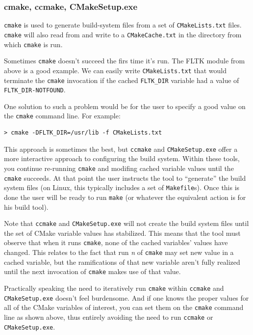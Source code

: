 \documentclass[letterpaper,10pt]{article}
\begin{document}
\subsubsection{cmake, ccmake, CMakeSetup.exe}
\label{sec:ccmake}
\verb|cmake| is used to generate build-system files from a set of \verb|CMakeLists.txt|
files.  \verb|cmake| will also read from and write to a \verb|CMakeCache.txt| in the
directory from which \verb|cmake| is run.

Sometimes \verb|cmake| doesn't succeed the firs time it's run.  The FLTK module from
above is a good example.  We can easily write \verb|CMakeLists.txt| that would terminate
the \verb|cmake| invocation if the cached \verb|FLTK_DIR| variable had a value of \verb|FLTK_DIR-NOTFOUND|.

One solution to such a problem would be for the user to specify a good value on the
\verb|cmake| command line.  For example:
\begin{verbatim}
> cmake -DFLTK_DIR=/usr/lib -f CMakeLists.txt
\end{verbatim} 

This approach is sometimes the best, but \verb|ccmake| and \verb|CMakeSetup.exe| offer a
more interactive approach to configuring the build system.  Within these tools, you continue
re-running \verb|cmake| and modifing cached variable values until the \verb|cmake| succeeds.
At that point the user instructs the tool to ``generate'' the build system files (on Linux,
this typically includes a set of \verb|Makefile|s).  Once this is done the user will 
be ready to run \verb|make| (or whatever the equivalent action is for his build tool).

Note that \verb|ccmake| and \verb|CMakeSetup.exe| will not create the build system files
until the set of CMake variable values has stabilized.  This means that the tool must observe
that when it runs \verb|cmake|, none of the cached variables' values have changed.  This
relates to the fact that run \textit{n} of \verb|cmake| may set new value in a cached variable,
but the ramifications of that new variable aren't fully realized until the next invocation of
\verb|cmake| makes use of that value.

Practically speaking the need to iteratively run \verb|cmake| within \verb|ccmake| and \verb|CMakeSetup.exe| doesn't feel burdensome.  And if one knows the proper values for all
of the CMake variables of interest, you can set them on the \verb|cmake| command line 
as shown above, thus entirely avoiding the need to run \verb|ccmake| or
\verb|CMakeSetup.exe|.
\end{document}
